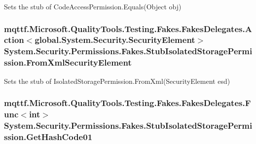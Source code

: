 Sets the stub of Code\-Access\-Permission.\-Equals(\-Object obj)

\hypertarget{class_system_1_1_security_1_1_permissions_1_1_fakes_1_1_stub_isolated_storage_permission_a8fe3294add15613b09faaec01e7bf852}{
\subsubsection[{From\-Xml\-Security\-Element}]{\setlength{\rightskip}{0pt plus 5cm}mqttf.\-Microsoft.\-Quality\-Tools.\-Testing.\-Fakes.\-Fakes\-Delegates.\-Action$<$global.\-System.\-Security.\-Security\-Element$>$ System.\-Security.\-Permissions.\-Fakes.\-Stub\-Isolated\-Storage\-Permission.\-From\-Xml\-Security\-Element}}\label{class_system_1_1_security_1_1_permissions_1_1_fakes_1_1_stub_isolated_storage_permission_a8fe3294add15613b09faaec01e7bf852}


Sets the stub of Isolated\-Storage\-Permission.\-From\-Xml(\-Security\-Element esd)

\hypertarget{class_system_1_1_security_1_1_permissions_1_1_fakes_1_1_stub_isolated_storage_permission_a99784b6d782a775742430bf3ed2b8e97}{
\subsubsection[{Get\-Hash\-Code01}]{\setlength{\rightskip}{0pt plus 5cm}mqttf.\-Microsoft.\-Quality\-Tools.\-Testing.\-Fakes.\-Fakes\-Delegates.\-Func$<$int$>$ System.\-Security.\-Permissions.\-Fakes.\-Stub\-Isolated\-Storage\-Permission.\-Get\-Hash\-Code01}}\label{class_system_1_1_security_1_1_permissions_1_1_fakes_1_1_stub_isolated_storage_permission_a99784b6d782a775742430bf3ed2b8e97}


